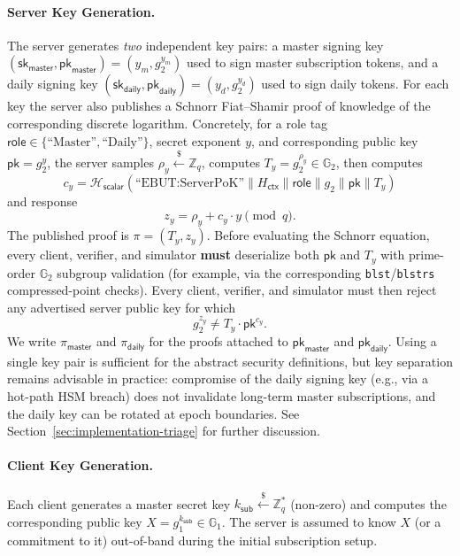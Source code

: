 \documentclass[11pt]{article}
\theoremstyle{definitionstyle}
\theoremstyle{plain}
\begin{document}
\paragraph{Server Key Generation.}
The server generates \emph{two} independent key pairs: a master signing key $(\mathsf{sk}_{\mathsf{master}}, \mathsf{pk}_{\mathsf{master}}) = (y_m, g_2^{y_m})$ used to sign master subscription tokens, and a daily signing key $(\mathsf{sk}_{\mathsf{daily}}, \mathsf{pk}_{\mathsf{daily}}) = (y_d, g_2^{y_d})$ used to sign daily tokens. For each key the server also publishes a Schnorr Fiat--Shamir proof of knowledge of the corresponding discrete logarithm. Concretely, for a role tag $\mathsf{role} \in \{\text{``Master''},\text{``Daily''}\}$, secret exponent $y$, and corresponding public key $\mathsf{pk}=g_2^y$, the server samples $\rho_y \xleftarrow{\$} \mathbb{Z}_q$, computes $T_y = g_2^{\rho_y} \in \mathbb{G}_2$, then computes
\[
c_y = \mathcal{H}_{\mathsf{scalar}}(\text{``EBUT:ServerPoK''} \parallel H_{\mathsf{ctx}} \parallel \mathsf{role} \parallel g_2 \parallel \mathsf{pk} \parallel T_y)
\]
and response
\[
z_y = \rho_y + c_y \cdot y \pmod q.
\]
The published proof is $\pi = (T_y,z_y)$. Before evaluating the Schnorr equation, every client, verifier, and simulator \textbf{must} deserialize both $\mathsf{pk}$ and $T_y$ with prime-order $\mathbb{G}_2$ subgroup validation (for example, via the corresponding \texttt{blst}/\texttt{blstrs} compressed-point checks). Every client, verifier, and simulator must then reject any advertised server public key for which
\[
g_2^{z_y} \neq T_y \cdot \mathsf{pk}^{c_y}.
\]
We write $\pi_{\mathsf{master}}$ and $\pi_{\mathsf{daily}}$ for the proofs attached to $\mathsf{pk}_{\mathsf{master}}$ and $\mathsf{pk}_{\mathsf{daily}}$. Using a single key pair is sufficient for the abstract security definitions, but key separation remains advisable in practice: compromise of the daily signing key (e.g., via a hot-path HSM breach) does not invalidate long-term master subscriptions, and the daily key can be rotated at epoch boundaries. See Section~\ref{sec:implementation-triage} for further discussion.

\paragraph{Client Key Generation.}
Each client generates a master secret key $k_{\mathsf{sub}} \xleftarrow{\$} \mathbb{Z}_q^*$ (non-zero) and computes the corresponding public key $X = g_1^{k_{\mathsf{sub}}} \in \mathbb{G}_1$. The server is assumed to know $X$ (or a commitment to it) out-of-band during the initial subscription setup.
\end{document}
